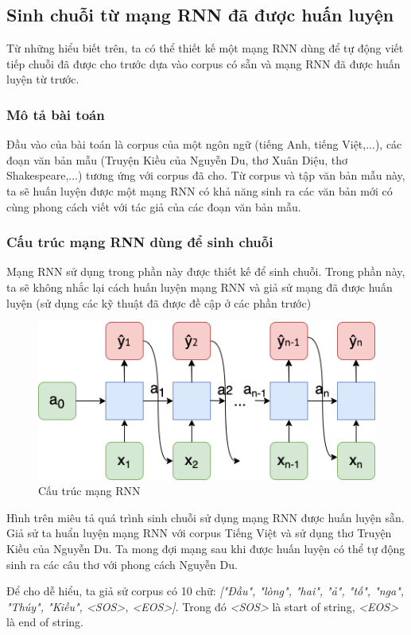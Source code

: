 \subsection{Sinh chuỗi từ mạng RNN đã được huấn luyện}
\label{string generation using RNN}
Từ những hiểu biết trên, ta có thể thiết kế một mạng RNN dùng để tự động viết tiếp chuỗi đã được cho trước dựa vào corpus có sẵn và mạng RNN đã được huấn luyện từ trước.
\subsubsection{Mô tả bài toán}
Đầu vào của bài toán là corpus của một ngôn ngữ (tiếng Anh, tiếng Việt,...), các đoạn văn bản mẫu (Truyện Kiều của Nguyễn Du, thơ Xuân Diệu, thơ Shakespeare,...) tương ứng với corpus đã cho. Từ corpus và tập văn bản mẫu này, ta sẽ huấn luyện được một mạng RNN có khả năng sinh ra các văn bản mới có cùng phong cách viết với tác giả của các đoạn văn bản mẫu.

\subsubsection{Cấu trúc mạng RNN dùng để sinh chuỗi}
Mạng RNN sử dụng trong phần này được thiết kế để sinh chuỗi. Trong phần này, ta sẽ không nhắc lại cách huấn luyện mạng RNN và giả sử mạng đã được huấn luyện (sử dụng các kỹ thuật đã được đề cập ở các phần trước)

\begin{figure}[h!]
	\centering
		\includegraphics[width=0.7\columnwidth]{chapter07/figure-sec3/rnn_network.png}
		\centering
	\caption{Cấu trúc mạng RNN}
	\label{fig:rnn_network}
\end{figure}

Hình trên miêu tả quá trình sinh chuỗi sử dụng mạng RNN được huấn luyện sẵn. Giả sử ta huẩn luyện mạng RNN với corpus Tiếng Việt và sử dụng thơ Truyện Kiều của Nguyễn Du. Ta mong đợi mạng sau khi được huấn luyện có thể tự động sinh ra các câu thơ với phong cách Nguyễn Du.

Để cho dễ hiểu, ta giả sử corpus có 10 chữ: \textit{["Đầu", "lòng", "hai", "ả", "tố", "nga", "Thúy", "Kiều", <SOS>, <EOS>]}. Trong đó \textit{<SOS>} là start of string, \textit{<EOS>} là end of string.

